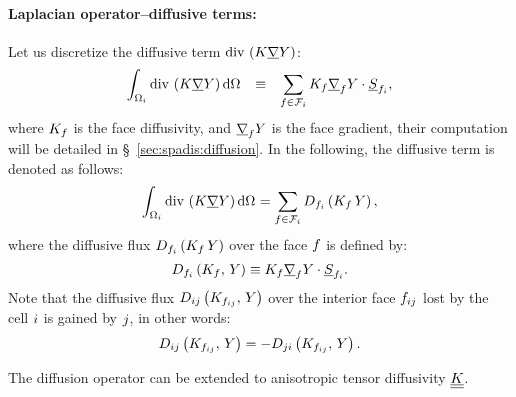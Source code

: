\paragraph{Laplacian operator--diffusive terms:}
Let us discretize the diffusive term $\text{div}\, \left(  K \underline{\nabla} Y  \right) $:
%
 \begin{equation}\label{eq:spadis:diffusion_def}
 \begin{array}{r c l}
\displaystyle \int_{\Omega_{i}} \text{div}\, \left( K \underline{\nabla} Y\right) \mathrm{d} \Omega_{} &\equiv &
\displaystyle \sum_{{f} \in \mathcal{F}_{i}} K_{f} \underline{\nabla}_{f} Y \cdot \underline{S}_{{f_i}},
 \end{array}
 \end{equation}
  where $K_{f}$ is the face diffusivity, and $\underline{\nabla}_{f} Y$ is the face gradient, their computation will be detailed in \S~\ref{sec:spadis:diffusion}. In the following, the diffusive term is denoted as follows:
\begin{equation}\label{eq:spadis:diffusion_notation}
\int_{\Omega_{i}} \text{div}\, \left( K \underline{\nabla} Y\right) \mathrm{d} \Omega_{}
 =
\sum_{{f} \in \mathcal{F}_{i}} D_{f_i} \left(  K_{f} \,  Y \right),
\end{equation}
 where the diffusive flux $D_{f_i} \left(  K_{f} \,  Y \right)$ over the face ${f}$ is defined by:
 \begin{equation}\label{eq:spadis:diffusion_flux}
D_{f_i} \left( K_{f} , \, Y\right) \equiv   K_{f} \underline{\nabla}_{f} Y \cdot \underline{S}_{{f_i}}.
 \end{equation}
 Note that the diffusive flux $D_{ij} \left( K_{f_{ij}} , \, Y\right) $ over the interior face ${f_{ij}}$ lost by the cell $i$
 is gained by $j$, in other words:
 \begin{equation}\label{eq:spadis:diffusion_flux_symmetry}
D_{ij} \left( K_{f_{ij}} , \, Y\right) = - D_{ji} \left( K_{f_{ij}} , \, Y\right) .
 \end{equation}

 \begin{remark}
The diffusion operator can be extended to anisotropic tensor diffusivity $\underline{\underline{K}}$.
 \end{remark}

